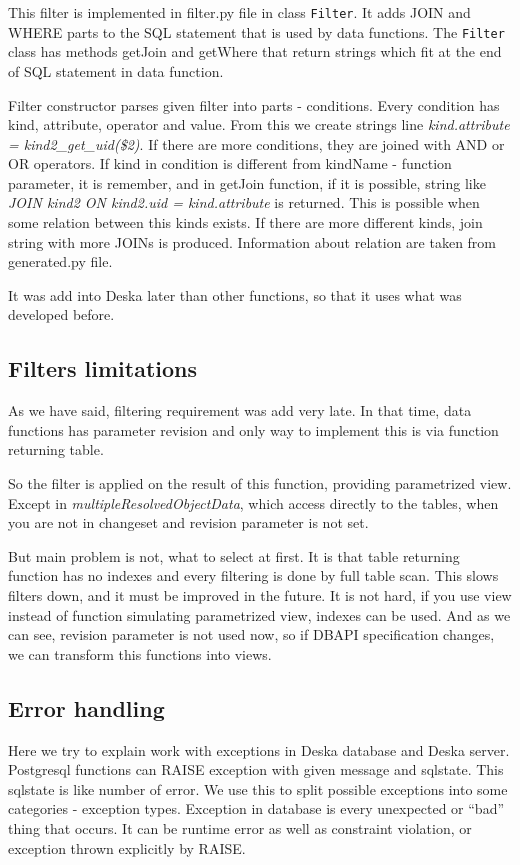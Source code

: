 \documentclass[deska]{subfiles}
\begin{document}
This filter is implemented in filter.py file in class {\tt Filter}.
It adds JOIN and WHERE parts to the SQL statement that is used by data functions. The {\tt Filter} class has
methods getJoin and getWhere that return strings which fit at the end of SQL statement in data function.

Filter constructor parses given filter into parts - conditions.
Every condition has kind, attribute, operator and value. From this we create strings line
{\em kind.attribute = kind2\_get\_uid(\$2)}. If there are more conditions, they are joined with AND or OR
operators.
If kind in condition is different from kindName - function parameter, it is remember,
and in getJoin function, if it is possible, string like {\em JOIN kind2 ON kind2.uid = kind.attribute}
is returned. This is possible when some relation between this kinds exists.
If there are more different kinds, join string with more JOINs is produced.
Information about relation are taken from generated.py file.

It was add into Deska later than other functions, so that it uses what was developed before.

\subsection{Filters limitations}
\label{sec:filter-speed}
As we have said, filtering requirement was add very late. In that time, data functions has parameter revision
and only way to implement this is via function returning table.

So the filter is applied on the result of this function, providing parametrized view.
Except in {\em multipleResolvedObjectData}, which access directly to the tables, when
you are not in changeset and revision parameter is not set.

But main problem is not, what to select at first. It is that table returning function has
no indexes and every filtering is done by full table scan.
This slows filters down, and it must be improved in the future. It is not hard,
if you use view instead of function simulating parametrized view, indexes can be used.
And as we can see, revision parameter is not used now, so if DBAPI specification changes,
we can transform this functions into views. 

\subsection{Error handling}
Here we try to explain work with exceptions in Deska database and Deska server. Postgresql functions can RAISE exception with given message and sqlstate.
This sqlstate is like number of error. We use this to split possible exceptions into some categories - exception types. Exception in database is
every unexpected or “bad” thing that occurs. It can be runtime error as well as constraint violation, or exception thrown explicitly by RAISE.
\end{document}
